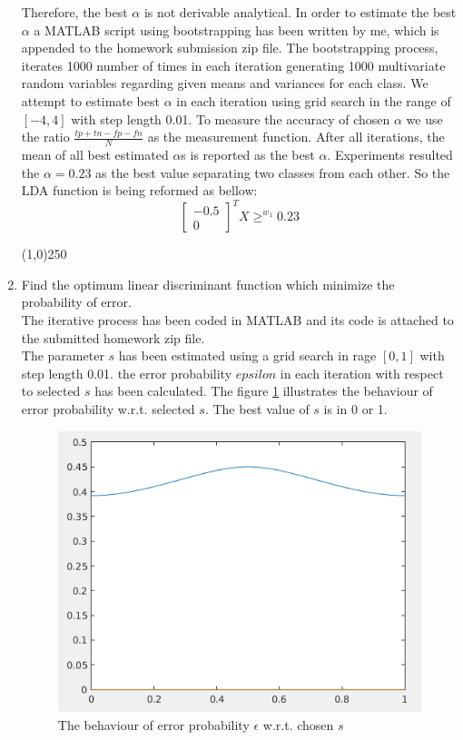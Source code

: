 \documentclass[12pt]{article}
\begin{document}
\begin{enumerate}
Therefore, the best $\alpha$ is not derivable analytical. In order to estimate the best $\alpha$ a MATLAB script using bootstrapping has been written by me, which is appended to the homework submission zip file. The bootstrapping process, iterates 1000 number of times in each iteration generating 1000 multivariate random variables regarding given means and variances for each class. We attempt to estimate best $\alpha$ in each iteration using grid search in the range of $[-4,4]$ with step length 0.01. To measure the accuracy of chosen $\alpha$ we use the ratio $\frac{tp + tn - fp - fn}{N}$ as the measurement function. After all iterations, the mean of all best estimated $\alpha$s is reported as the best $\alpha$. Experiments resulted the $\alpha = 0.23$ as the best value separating two classes from each other. So the LDA function is being reformed as bellow:
\begin{equation}
\left[ \begin{matrix}
-0.5 \\ 0
\end{matrix} \right]^T X \geq^{w_1} 0.23
\end{equation}
\begin{center}
\line(1,0){250}
\end{center}

\item Find the optimum linear discriminant function which minimize the probability of
error.\\
The iterative process has been coded in MATLAB and its code is attached to the submitted homework zip file. \\
The parameter $s$ has been estimated using a grid search in rage $[0, 1]$ with step length 0.01. the error probability $epsilon$ in each iteration with respect to selected $s$ has been calculated. The figure \ref{fig:2} illustrates the behaviour of error probability w.r.t. selected $s$. The best value of $s$ is in 0 or 1. 

\begin{figure}[h]
\centering
\includegraphics[scale=0.4]{Imgs/2_2_1.png}
\caption{The behaviour of error probability $\epsilon$ w.r.t. chosen $s$}
\label{fig:2}
\end{figure}


\end{enumerate}
\end{document}

